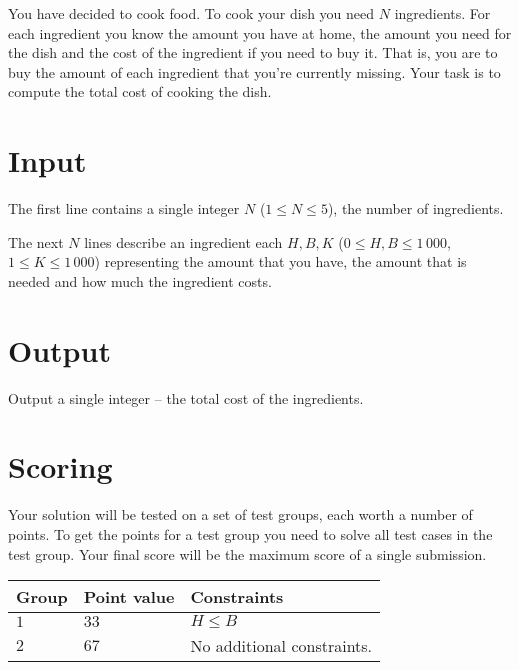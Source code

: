 You have decided to cook food.
To cook your dish you need $N$ ingredients.
For each ingredient you know the amount you have at home, the amount you need for the dish and the cost of the ingredient if you need to buy it.
That is, you are to buy the amount of each ingredient that you're currently missing.
Your task is to compute the total cost of cooking the dish.

\section*{Input}
The first line contains a single integer $N$ ($1 \le N \le 5$), the number of ingredients.

The next $N$ lines describe an ingredient each $H, B, K$ ($0 \le H, B \le 1\,000$, $1 \le K \le 1\,000$) representing the amount that you have, the amount that is needed and how much the ingredient costs.

\section*{Output}
Output a single integer -- the total cost of the ingredients.

\section*{Scoring}
Your solution will be tested on a set of test groups, each worth a number of points.
To get the points for a test group you need to solve all test cases in the test group. Your final score will be the maximum score of a single submission.

\noindent
\begin{tabular}{| l | l | p{12cm} |}
  \hline
  \textbf{Group} & \textbf{Point value} & \textbf{Constraints} \\ \hline
  $1$    & $33$        &  $H \le B$ \\ \hline
  $2$    & $67$        & No additional constraints. \\ \hline
\end{tabular}
